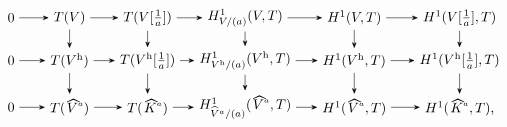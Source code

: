 \documentclass[a4paper,11pt,reqno]{amsart}
\newcommand{\wh}{\widehat}
\newcommand{\hva}{\!\stackon[-8pt]{\;$V^{\raisebox{1pt}{$\mathsmaller{\mathsmaller{a}}$}}$}{\vstretch{1.5}{\hstretch{1.7}{\widehat{\phantom{}}}}}}
\newcommand{\hka}{\!\stackon[-8pt]{\;$K^{\raisebox{1pt}{$\mathsmaller{\mathsmaller{a}}$}}$}{\vstretch{1.5}{\hstretch{1.7}{\widehat{\phantom{}}}}}}
\newcommand{\via}{V{[\f{1}{a}]}}
\newcommand{\nhva}{\wh{V}^a}
\providecommand{\f}[2]{\frac{#1}{#2}}
\newcommand{\tst}{\textstyle}
\theoremstyle{plain}
\theoremstyle{remark}
\theoremstyle{definition}
\theoremstyle{plain}
\theoremstyle{definition}
\theoremstyle{subsection-tweak}
\theoremstyle{subsection-tweak}
\numberwithin{equation}{subsection}
\begin{document}
     \[
      \tst \tikz {
      \node  (A) at (0.5,0.6) {$0$};
      \node  (B) at (2,0.6) {$T(V)$};
      \node  (C) at (4,0.6) {$T(\via)$};
      \node  (D) at (6.5,0.6) {$H^1_{V/(a)}(V,T)$};
      \node  (E) at (9.3,0.6) {$H^1(V,T)$};
      \node  (F) at (12,0.6) {$H^1(\via,T)$};
      \node  (a) at (0.5,-0.5)   {$0$};
      \node  (b) at (2,-0.5) {$T(V^{\mathrm{h}})$};
      \node  (c) at (4,-0.5) {$T(V^{\mathrm{h}}[\f{1}{a}])$};
      \node  (d) at (6.5,-0.5) {$H^1_{\small{V^{\mathrm{h}}/(a)}}(V^{\mathrm{h}},T)$};
      \node  (e) at (9.3,-0.5) {$H^1(V^{\mathrm{h}}, T)$};
      \node  (f) at (12,-0.5) {$H^1(V^{\mathrm{h}}[\f{1}{a}],T)$};
      \node  (aa) at (0.5,-1.7) {$0$};
      \node  (bb) at (2,-1.7) {$T(\hva)$};
      \node  (cc) at (4,-1.7) {$T(\hka)$};
      \node  (dd) at (6.5,-1.7) {$H^1_{\small{\nhva/(a)}}(\hva, T)$};
      \node  (ee) at (9.3,-1.7) {$H^1(\hva,T)$};
      \node  (ff) at (12,-1.7) {$H^1(\hka, T)$,};
      \draw [draw = black, thin,
      arrows={
      - Stealth }]
      (A) edge  (B);
      \draw [draw = black, thin,
      arrows={
      - Stealth }]
      (B) edge  (C);
      \draw [draw = black, thin,
      arrows={
      - Stealth }]
      (C) edge (D);
      \draw [draw = black, thin,
      arrows={
      - Stealth }]
      (D) edge (E);
      \draw [draw = black, thin,
      arrows={
      - Stealth }]
      (E) edge (F);
      \draw [draw = black, thin,
      arrows={
      - Stealth }]
      (B) edge (b);
      \draw [draw = black, thin,
      arrows={
      - Stealth }]
      (C) edge (c);
      \draw [draw = black, thin,
      arrows={
      - Stealth }]
      (D) edge (d);
      \draw [draw = black, thin,
      arrows={
      - Stealth }]
      (E) edge (e);
      \draw [draw = black, thin,
      arrows={
      - Stealth }]
      (F) edge (f); 
      \draw [draw = black, thin,
      arrows={
      - Stealth }]
      (a) edge (b);
      \draw [draw = black, thin,
      arrows={
      - Stealth }]
      (b) edge (c);
      \draw [draw = black, thin,
      arrows={
      - Stealth }]
      (c) edge (d);
      \draw [draw = black, thin,
      arrows={
      - Stealth }]
      (d) edge (e);
      \draw [draw = black, thin,
      arrows={
      - Stealth }]
      (e) edge (f);
      \draw [draw = black, thin,
      arrows={
      - Stealth }]
      (aa) edge (bb);
      \draw [draw = black, thin,
      arrows={
      - Stealth }]
      (bb) edge (cc);
      \draw [draw = black, thin,
      arrows={
      - Stealth }]
      (cc) edge (dd);
      \draw [draw = black, thin,
      arrows={
      - Stealth }]
      (dd) edge (ee);
      \draw [draw = black, thin,
      arrows={
      - Stealth }]
      (ee) edge (ff);
      \draw [draw = black, thin,
      arrows={
      - Stealth }]
      (b) edge (bb);
      \draw [draw = black, thin,
      arrows={
      - Stealth }]
      (c) edge (cc);
      \draw [draw = black, thin,
      arrows={
      - Stealth }]
      (d) edge (dd);
      \draw [draw = black, thin,
      arrows={
      - Stealth }]
      (e) edge (ee);
      \draw [draw = black, thin,
      arrows={
      - Stealth }]
      (f) edge (ff);
      }
      \]
\end{document}

